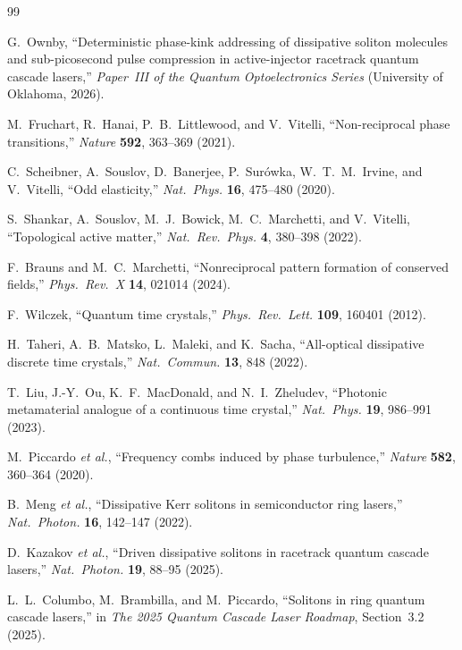 \documentclass[11pt,letterpaper]{article}
\begin{document}
\begin{thebibliography}{99}

G.~Ownby, ``Deterministic phase-kink addressing of dissipative soliton molecules and sub-picosecond pulse compression in active-injector racetrack quantum cascade lasers,'' \textit{Paper~III of the Quantum Optoelectronics Series} (University of Oklahoma, 2026).

M.~Fruchart, R.~Hanai, P.~B.~Littlewood, and V.~Vitelli, ``Non-reciprocal phase transitions,'' \textit{Nature} \textbf{592}, 363--369 (2021).

C.~Scheibner, A.~Souslov, D.~Banerjee, P.~Sur\'owka, W.~T.~M.~Irvine, and V.~Vitelli, ``Odd elasticity,'' \textit{Nat.\ Phys.} \textbf{16}, 475--480 (2020).

S.~Shankar, A.~Souslov, M.~J.~Bowick, M.~C.~Marchetti, and V.~Vitelli, ``Topological active matter,'' \textit{Nat.\ Rev.\ Phys.} \textbf{4}, 380--398 (2022).

F.~Brauns and M.~C.~Marchetti, ``Nonreciprocal pattern formation of conserved fields,'' \textit{Phys.\ Rev.\ X} \textbf{14}, 021014 (2024).

F.~Wilczek, ``Quantum time crystals,'' \textit{Phys.\ Rev.\ Lett.} \textbf{109}, 160401 (2012).

H.~Taheri, A.~B.~Matsko, L.~Maleki, and K.~Sacha, ``All-optical dissipative discrete time crystals,'' \textit{Nat.\ Commun.} \textbf{13}, 848 (2022).

T.~Liu, J.-Y.~Ou, K.~F.~MacDonald, and N.~I.~Zheludev, ``Photonic metamaterial analogue of a continuous time crystal,'' \textit{Nat.\ Phys.} \textbf{19}, 986--991 (2023).

M.~Piccardo \textit{et al.}, ``Frequency combs induced by phase turbulence,'' \textit{Nature} \textbf{582}, 360--364 (2020).

B.~Meng \textit{et al.}, ``Dissipative Kerr solitons in semiconductor ring lasers,'' \textit{Nat.\ Photon.} \textbf{16}, 142--147 (2022).

D.~Kazakov \textit{et al.}, ``Driven dissipative solitons in racetrack quantum cascade lasers,'' \textit{Nat.\ Photon.} \textbf{19}, 88--95 (2025).

L.~L.~Columbo, M.~Brambilla, and M.~Piccardo, ``Solitons in ring quantum cascade lasers,'' in \textit{The 2025 Quantum Cascade Laser Roadmap}, Section~3.2 (2025).


\end{thebibliography}
\end{document}
